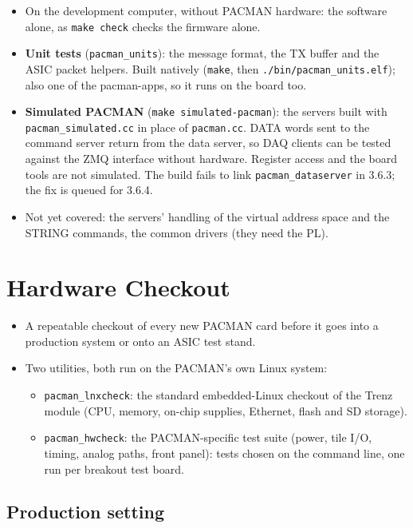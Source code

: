 \documentclass[11pt]{article}
\begin{document}
\begin{itemize}
\item On the development computer, without PACMAN hardware:  the software alone, as \texttt{make check} checks the
  firmware alone.
\item \textbf{Unit tests} (\texttt{pacman\_units}):  the message format, the TX buffer and the ASIC packet helpers.
  Built natively (\texttt{make}, then \texttt{./bin/pacman\_units.elf});  also one of the pacman-apps, so it runs
  on the board too.
\item \textbf{Simulated PACMAN} (\texttt{make simulated-pacman}):  the servers built with
  \texttt{pacman\_simulated.cc} in place of \texttt{pacman.cc}.  DATA words sent to the command server return from
  the data server, so DAQ clients can be tested against the ZMQ interface without hardware.  Register access and
  the board tools are not simulated.  The build fails to link \texttt{pacman\_dataserver} in 3.6.3;  the fix is
  queued for 3.6.4.
\item Not yet covered:  the servers' handling of the virtual address space and the STRING commands, the common
  drivers (they need the PL).
\end{itemize}

\section{Hardware Checkout}\label{sec:checkout}

\begin{itemize}
\item A repeatable checkout of every new PACMAN card before it goes into a production system or onto an ASIC test
  stand.
\item Two utilities, both run on the PACMAN's own Linux system:
  \begin{itemize}
  \item \texttt{pacman\_lnxcheck}: the standard embedded-Linux checkout of the Trenz module (CPU, memory,
    on-chip supplies, Ethernet, flash and SD storage).
  \item \texttt{pacman\_hwcheck}: the PACMAN-specific test suite (power, tile I/O, timing, analog paths, front
    panel):  tests chosen on the command line, one run per breakout test board.
  \end{itemize}
\end{itemize}

\subsection{Production setting}
\end{document}
